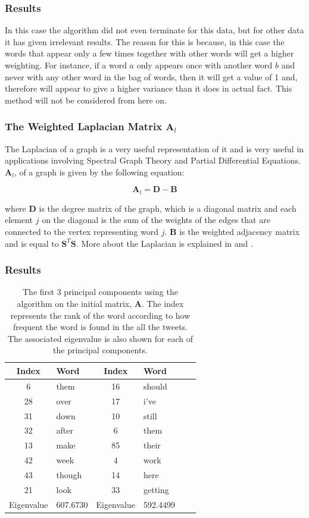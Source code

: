\documentclass[11pt,a4paper]{article}
\newcommand{\smat}{\mathbf{S}}
\newcommand{\tp}{^T}
\begin{document}
\subsubsection*{Results}
In this case the algorithm did not even terminate for this data, but for other data it has given irrelevant results. The reason for this is because, in this case the words that appear only a few times together with other words will get a higher weighting. For instance, if a word $a$ only appears once with another word $b$ and never with any other word in the bag of words, then it will get a value of 1 and, therefore will appear to give a higher variance than it does in actual fact. This method will not be considered from here on.

\subsubsection{The Weighted Laplacian Matrix $\mathbf{A}_{l}$}

The Laplacian of a graph is a very useful representation of it and is very useful in applications involving Spectral Graph Theory and Partial Differential Equations. $\mathbf{A}_{l}$, of a graph is given by the following equation:

\begin{equation}
\mathbf{A}_{l} = \mathbf{D} - \mathbf{B}
\end{equation}

where $\mathbf{D}$ is the degree matrix of the graph, which is a diagonal matrix and each element $j$ on the diagonal is the sum of the weights of the edges that are connected to the vertex representing word $j$. $\mathbf{B}$ is the weighted adjacency matrix and is equal to $\smat\tp\smat$. More about the Laplacian is explained in \cite{laplacian} and \cite{laplacian_spielman}. 

\subsubsection*{Results}
\begin{table}[H]
\center
\begin{tabular}{| c l | c l | c l |}
\hline
Index & Word & Index & Word\\
\hline
6 & them & 16 & should\\
28 & over & 17 & i've\\
31 & down & 10 & still\\
32 & after & 6 & them \\
13 & make & 85 & their\\
42 & week & 4 & work\\
43 & though & 14 & here\\
21 & look & 33 & getting\\
\hline
Eigenvalue & 607.6730  & Eigenvalue & 592.4499 \\
\hline
\end{tabular}
\caption{The first 3 principal components using the algorithm on the initial matrix, $ \mathbf{A}$. The index represents the rank of the word according to how frequent the word is found in the all the tweets. The associated eigenvalue is also shown for each of the principal components.}
\end{table}
\end{document}
